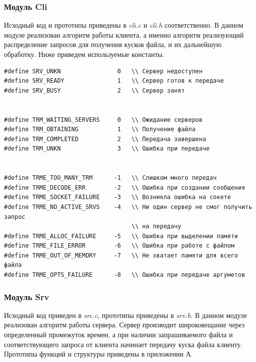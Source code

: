 \subsubsection*{Модуль Cli}
Исходный код и прототипы приведены в \textit{cli.c} и \textit{cli.h} соответственно. В
данном модуле реализован алгоритм работы клиента, а именно алгоритм
реализующий распределение запросов для получения кусков файла, и их
дальнейшую обработку. Ниже приведем используемые константы.
\begin{lstlisting}
#define SRV_UNKN                0   \\ Сервер недоступен
#define SRV_READY               1   \\ Сервер готов к передаче
#define SRV_BUSY                2   \\ Сервер занят


#define TRM_WAITING_SERVERS     0   \\ Ожидание серверов
#define TRM_OBTAINING           1   \\ Получение файла
#define TRM_COMPLETED           2   \\ Передача завершена
#define TRM_UNKN                3   \\ Ошибка при передаче


#define TRME_TOO_MANY_TRM      -1   \\ Слишком много передач
#define TRME_DECODE_ERR        -2   \\ Ошибка при создании сообщения
#define TRME_SOCKET_FAILURE    -3   \\ Возникла ошибка на сокете
#define TRME_NO_ACTIVE_SRVS    -4   \\ Ни один сервер не смог получить запрос
                                    \\ на передачу
#define TRME_ALLOC_FAILURE     -5   \\ Ошибка при выделении памяти
#define TRME_FILE_ERROR        -6   \\ Ошибка при работе с файлом
#define TRME_OUT_OF_MEMORY     -7   \\ Не хватает памяти для всего файла
#define TRME_OPTS_FAILURE      -8   \\ Ошибка при передаче аргуметов
\end{lstlisting}

\subsubsection*{Модуль Srv}
Исходный код приведен в \textit{src.c}, прототипы приведены в \textit{srv.h}. В данном
модуле реализован алгоритм работы сервера. Сервер производит
широковещание через определенный промежуток времен, а при наличии
запрашиваемого файла и соответствующего запроса от клиента начинает
передачу куска файла клиенту. Прототипы функций и структуры приведены
в приложении А.

